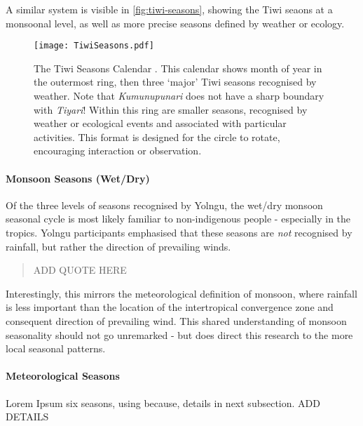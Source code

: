 A similar system is visible in \autoref{fig:tiwi-seasons}, showing the Tiwi seaons at
a monsoonal level, as well as more precise seasons defined by weather or ecology.


\begin{landscape}
\begin{figure}[p]
    \centering
    \texttt{[image: TiwiSeasons.pdf]}
    \caption[The Tiwi Seasons Calendar \citep{CSIROcals}]{
        The Tiwi Seasons Calendar \citep{CSIROcals}.
        This calendar shows month of year in the outermost ring,
        then three `major' Tiwi seasons recognised by weather.
        Note that \textit{Kumunupunari} does not have a sharp boundary with \textit{Tiyari}!
        Within this ring are smaller seasons, recognised by weather
        or ecological events and associated with particular activities.
        This format is designed for the circle to rotate, encouraging interaction or observation.
        }
    \label{fig:tiwi-seasons}
\end{figure}
\end{landscape}


\paragraph{Monsoon Seasons (Wet/Dry)}

Of the three levels of seasons recognised by Yolngu,
the wet/dry monsoon seasonal cycle is most likely familiar to non-indigenous people -
especially in the tropics.  Yolngu participants emphasised that these seasons
are \emph{not} recognised by rainfall, but rather the direction of prevailing winds.

\blockquote{
    ADD QUOTE HERE
}

Interestingly, this mirrors the meteorological definition of monsoon,
where rainfall is less important than the location of the intertropical
convergence zone and consequent direction of prevailing wind.
This shared understanding of monsoon seasonality should not go unremarked -
but does direct this research to the more local seasonal patterns.


\paragraph{Meteorological Seasons}

Lorem Ipsum six seasons, using because, details in next subsection.  ADD DETAILS






